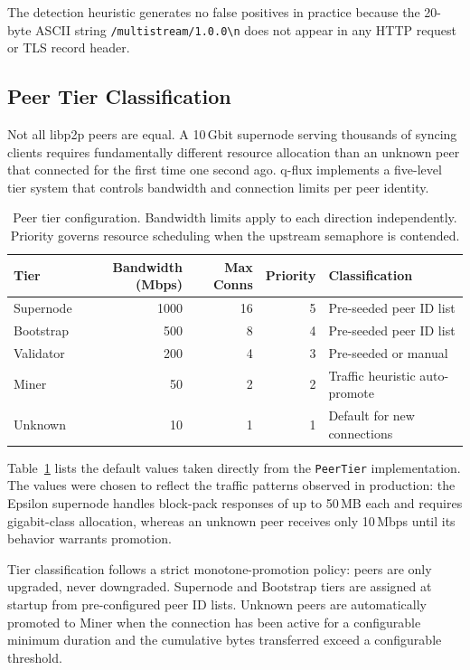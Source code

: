 \documentclass[a4paper, 11pt]{article}
\begin{document}
The detection heuristic generates no false positives in practice
because the 20-byte ASCII string \texttt{/multistream/1.0.0\textbackslash n}
does not appear in any HTTP request or TLS record header.

\subsection{Peer Tier Classification}
\label{sec:peer-tier}

Not all libp2p peers are equal. A 10\,Gbit supernode serving thousands
of syncing clients requires fundamentally different resource allocation
than an unknown peer that connected for the first time one second ago.
q-flux implements a five-level tier system that controls bandwidth and
connection limits per peer identity.

\begin{table}[t]
\centering
\caption{Peer tier configuration. Bandwidth limits apply to each
  direction independently. Priority governs resource scheduling when
  the upstream semaphore is contended.}
\label{tab:peer-tiers}
\begin{tabular}{@{}lrrrl@{}}
\toprule
\textbf{Tier} & \textbf{Bandwidth (Mbps)} & \textbf{Max Conns} &
  \textbf{Priority} & \textbf{Classification} \\
\midrule
Supernode  & 1000  & 16 & 5 & Pre-seeded peer ID list \\
Bootstrap  & 500   & 8  & 4 & Pre-seeded peer ID list \\
Validator  & 200   & 4  & 3 & Pre-seeded or manual \\
Miner      & 50    & 2  & 2 & Traffic heuristic auto-promote \\
Unknown    & 10    & 1  & 1 & Default for new connections \\
\bottomrule
\end{tabular}
\end{table}

Table~\ref{tab:peer-tiers} lists the default values taken directly
from the \texttt{PeerTier} implementation. The values were chosen to
reflect the traffic patterns observed in production: the Epsilon
supernode handles block-pack responses of up to 50\,MB each and
requires gigabit-class allocation, whereas an unknown peer receives
only 10\,Mbps until its behavior warrants promotion.

Tier classification follows a strict monotone-promotion policy: peers
are only upgraded, never downgraded. Supernode and Bootstrap tiers are
assigned at startup from pre-configured peer ID lists. Unknown peers
are automatically promoted to Miner when the connection has been active
for a configurable minimum duration and the cumulative bytes transferred
exceed a configurable threshold.
\end{document}

